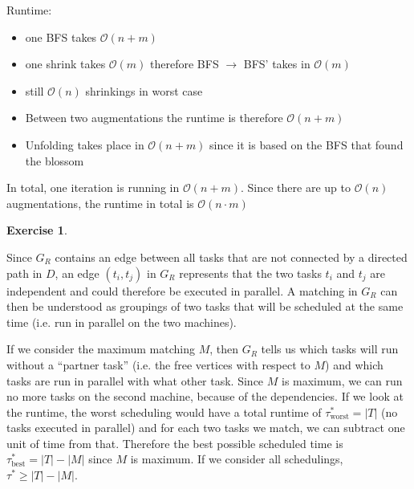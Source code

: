 \documentclass[a4paper,12pt,headsepline]{scrartcl}
\newtheorem{aufgabe}{Exercise}
\begin{document}
\begin{enumerate}[a)]
\begin{algorithm}[H]
\end{algorithm}

    Runtime:
    \begin{itemize}
        \item one BFS takes $\mathcal{O}(n+m)$
        \item one shrink takes $\mathcal{O}(m)$ therefore BFS $\to$ BFS' takes in $\mathcal{O}(m)$ 
        \item still $\mathcal{O}(n)$ shrinkings in worst case
        \item Between two augmentations the runtime is therefore $\mathcal{O}(n+m)$
        \item Unfolding takes place in $\mathcal{O}(n+m)$ since it is based on the BFS that found the blossom
    \end{itemize}
    In total, one iteration is running in $\mathcal{O}(n+m)$. Since there are up to $\mathcal{O}(n)$ augmentations, the runtime in total is $\mathcal{O}(n\cdot m)$
  
\end{enumerate}

\newpage
\begin{aufgabe}
\end{aufgabe}

Since $G_R$ contains an edge between all tasks that are not connected by a directed path in $D$, an edge $(t_i,t_j)$ in $G_R$ represents that the two tasks $t_i$ and $t_j$ are independent and could therefore be executed in parallel.
A matching in $G_R$ can then be understood as groupings of two tasks that will be scheduled at the same time (i.e. run in parallel on the two machines).

If we consider the maximum matching $M$, then $G_R$ tells us which tasks will run without a ``partner task'' (i.e. the free vertices with respect to $M$) and which tasks are run in parallel with what other task.
Since $M$ is maximum, we can run no more tasks on the second machine, because of the dependencies.
If we look at the runtime, the worst scheduling would have a total runtime of $\tau_\text{worst}^*=|T|$ (no tasks executed in parallel) and for each two tasks we match, we can subtract one unit of time from that.
Therefore the best possible scheduled time is $\tau_\text{best}^*=|T|-|M|$ since $M$ is maximum.
If we consider all schedulings, $\tau^*\ge|T|-|M|$.
\end{document}
